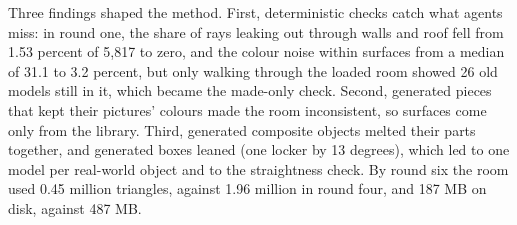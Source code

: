 \endgroup

Three findings shaped the method. First, deterministic checks catch what agents miss: in round one, the share of rays leaking out through walls and roof fell from 1.53 percent of 5,817 to zero, and the colour noise within surfaces from a median of 31.1 to 3.2 percent, but only walking through the loaded room showed 26 old models still in it, which became the made-only check. Second, generated pieces that kept their pictures' colours made the room inconsistent, so surfaces come only from the library. Third, generated composite objects melted their parts together, and generated boxes leaned (one locker by 13 degrees), which led to one model per real-world object and to the straightness check. By round six the room used 0.45 million triangles, against 1.96 million in round four, and 187 MB on disk, against 487 MB.

